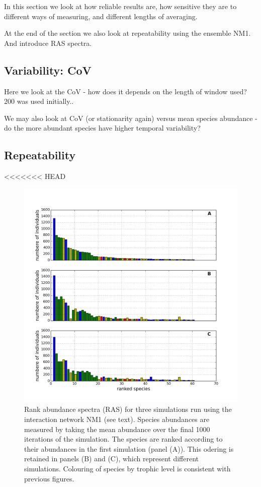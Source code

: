 In this section we look at how reliable results are, how sensitive they are to different ways of measuring, and different lengths of averaging. 

At the end of the section we also look at repeatability using the ensemble NM1. And introduce RAS spectra.

\subsection{Variability: CoV}

Here we look at the CoV - how does it depends on the length of window used? 200 was used initially..

We may also look at CoV (or stationarity again) versus mean species abundance - do the more abundant species have higher temporal variability?

\subsection{Repeatability}

<<<<<<< HEAD
\begin{figure}[hp]
	\centering
	\includegraphics[width=1.0\linewidth]{"./chapters/chapter04b/figures/ras_3examples"}
    \caption{Rank abundance spectra (RAS) for three simulations run using the interaction network NM1 (see text). Species abundances are measured by taking the mean abundance over the final 1000 iterations of the simulation. The species are ranked according to their abundances in the first simulation (panel (A)). This odering is retained in panels (B) and (C), which represent different simulations. Colouring of species by trophic level is consistent with previous figures.}    
    \label{fig:ras_3examples}
\end{figure}


